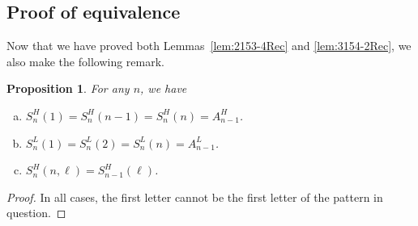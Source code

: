 \documentclass[11pt]{amsart}
\newtheorem{proposition}[theorem]{Proposition}
\theoremstyle{definition}
\begin{document}
\subsection{Proof of equivalence}
Now that we have proved both Lemmas~\ref{lem:2153-4Rec} and \ref{lem:3154-2Rec},
we also make the following remark.
\begin{proposition}
	\label{prop:easyH}
	For any $n$, we have
	\begin{enumerate}[(a)]
		\item $S_n^H(1) = S_n^H(n-1) = S_n^H(n) = A_{n-1}^H$.
		\item $S_n^L(1) = S_n^L(2) = S_n^L(n) = A_{n-1}^L$.
		\item $S_n^H(n,\ell) = S_{n-1}^H(\ell)$.
	\end{enumerate}
\end{proposition}
\begin{proof}
	In all cases, the first letter cannot
	be the first letter of the pattern in question.
\end{proof}
\end{document}
